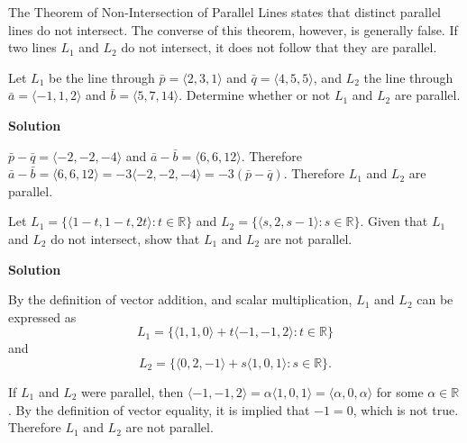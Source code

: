 \begin{notebox}
  The Theorem of Non-Intersection of Parallel Lines states that distinct parallel lines do not intersect.
  The converse of this theorem, however, is generally false. If two lines $L_1$ and $L_2$ do not intersect, it does not follow that they are parallel.
\end{notebox}
\begin{examplebox}
Let \( L_1 \) be the line through \( \bar{p} = \langle 2, 3, 1 \rangle \) and \( \bar{q} = \langle 4, 5, 5 \rangle \), and \( L_2 \) the line through \( \bar{a} = \langle -1, 1, 2 \rangle \) and \( \bar{b} = \langle 5, 7, 14 \rangle \). Determine whether or not \( L_1 \) and \( L_2 \) are parallel.

\vspace{0.5em}

\textbf{Solution}

\vspace{0.5em}

\( \bar{p} - \bar{q} = \langle -2, -2, -4 \rangle \) and \( \bar{a} - \bar{b} = \langle 6, 6, 12 \rangle \).  
Therefore  
\( \bar{a} - \bar{b} = \langle 6, 6, 12 \rangle = -3\langle -2, -2, -4 \rangle = -3(\bar{p} - \bar{q}) \).  
Therefore \( L_1 \) and \( L_2 \) are parallel.
\end{examplebox}

\begin{examplebox}
Let \( L_1 = \{\langle 1 - t, 1 - t, 2t \rangle : t \in \mathbb{R} \} \) and \( L_2 = \{\langle s, 2, s - 1 \rangle : s \in \mathbb{R} \} \).  
Given that \( L_1 \) and \( L_2 \) do not intersect, show that \( L_1 \) and \( L_2 \) are not parallel.

\vspace{0.5em}

\textbf{Solution}

\vspace{0.5em}

By the definition of vector addition, and scalar multiplication, \( L_1 \) and \( L_2 \) can be expressed as  
\[
L_1 = \{\langle 1, 1, 0 \rangle + t\langle -1, -1, 2 \rangle : t \in \mathbb{R} \}
\]
and  
\[
L_2 = \{\langle 0, 2, -1 \rangle + s\langle 1, 0, 1 \rangle : s \in \mathbb{R} \}.
\]

If \( L_1 \) and \( L_2 \) were parallel, then  
\(
\langle -1, -1, 2 \rangle = \alpha \langle 1, 0, 1 \rangle = \langle \alpha, 0, \alpha \rangle
\)
for some \( \alpha \in \mathbb{R} \).  
By the definition of vector equality, it is implied that \( -1 = 0 \), which is not true.  
Therefore \( L_1 \) and \( L_2 \) are not parallel.
\end{examplebox}

